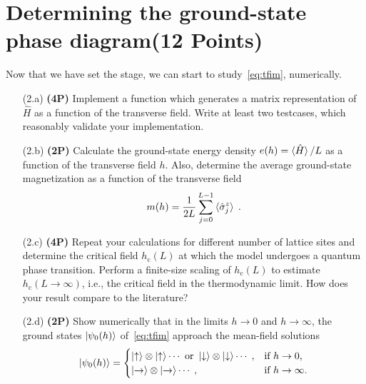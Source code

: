 \documentclass[a4paper, 12pt]{article}
\begin{document}
\section{Determining the ground-state phase diagram\textbf{(12 Points)}}
%
Now that we have set the stage, we can start to study~\cref{eq:tfim}, numerically.
%
\begin{itemize}
	\item[(2.a)] \textbf{(4P)}
	Implement a function which generates a matrix representation of $\hat H$ as a function of the transverse field.
	Write at least two testcases, which reasonably validate your implementation.
	\item[(2.b)] \textbf{(2P)}
	Calculate the ground-state energy density $e(h) = \braket{\hat H}/L$ as a function of the transverse field $h$.
	Also, determine the average ground-state magnetization as a function of the transverse field
	\begin{equation}
		m(h) = \frac{1}{2L} \sum_{j=0}^{L-1} \braket{\hat \sigma^z_j} \;.
	\end{equation}
	\item[(2.c)] \textbf{(4P)}
	Repeat your calculations for different number of lattice sites and determine the critical field $h_\mathrm{c}(L)$ at which the model undergoes a quantum phase transition.
	Perform a finite-size scaling of $h_\mathrm{c}(L)$ to estimate $h_\mathrm{c}(L\rightarrow \infty)$, i.e., the critical field in the thermodynamic limit.
	How does your result compare to the literature?
	\item[(2.d)] \textbf{(2P)}
	Show numerically that in the limits $h\rightarrow 0$ and $h\rightarrow \infty$, the ground states $\ket{\psi_0(h)}$ of~\cref{eq:tfim} approach the mean-field solutions
	\begin{equation}
		\ket{\psi_0(h)}
		=
		\begin{cases}
			\ket{\uparrow}\otimes\ket{\uparrow} \cdots \text{ or } \ket{\downarrow}\otimes\ket{\downarrow} \cdots\;, &\text{if $h\rightarrow 0$,} \\
			\ket{\rightarrow}\otimes\ket{\rightarrow} \cdots\;, &\text{if $h\rightarrow \infty$.} \\
		\end{cases}
	\end{equation}
\end{itemize}
%
\batchmode  %
\end{document}
